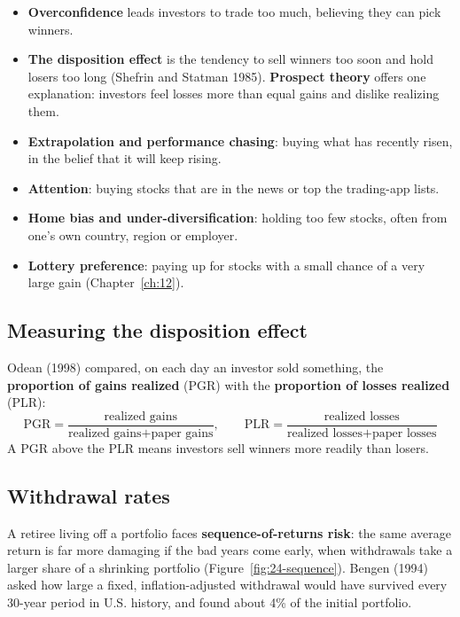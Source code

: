 \begin{itemize}
  \item \textbf{Overconfidence} leads investors to trade too much, believing they can pick winners.
  \item \textbf{The disposition effect} is the tendency to sell winners too soon and hold losers too long (Shefrin and Statman 1985). \textbf{Prospect theory} offers one explanation: investors feel losses more than equal gains and dislike realizing them.
  \item \textbf{Extrapolation and performance chasing}: buying what has recently risen, in the belief that it will keep rising.
  \item \textbf{Attention}: buying stocks that are in the news or top the trading-app lists.
  \item \textbf{Home bias and under-diversification}: holding too few stocks, often from one's own country, region or employer.
  \item \textbf{Lottery preference}: paying up for stocks with a small chance of a very large gain (Chapter~\ref{ch:12}).
\end{itemize}

\subsection{Measuring the disposition effect}

Odean (1998) compared, on each day an investor sold something, the \textbf{proportion of gains realized} (PGR) with the \textbf{proportion of losses realized} (PLR):
\begin{equation}
  \mathrm{PGR} = \frac{\text{realized gains}}{\text{realized gains} + \text{paper gains}}, \qquad
  \mathrm{PLR} = \frac{\text{realized losses}}{\text{realized losses} + \text{paper losses}}
  \label{eq:24-pgr}
\end{equation}
A PGR above the PLR means investors sell winners more readily than losers.

\subsection{Withdrawal rates}

A retiree living off a portfolio faces \textbf{sequence-of-returns risk}: the same average return is far more damaging if the bad years come early, when withdrawals take a larger share of a shrinking portfolio (Figure~\ref{fig:24-sequence}). Bengen (1994) asked how large a fixed, inflation-adjusted withdrawal would have survived every 30-year period in U.S. history, and found about 4\% of the initial portfolio.

